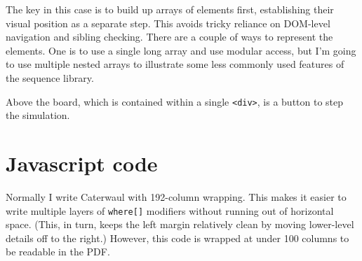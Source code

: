 \documentclass{report}
\begin{document}
    The key in this case is to build up arrays of elements first, establishing their visual position as a separate step. This avoids tricky reliance on DOM-level navigation and sibling
    checking. There are a couple of ways to represent the elements. One is to use a single long array and use modular access, but I'm going to use multiple nested arrays to illustrate some
    less commonly used features of the sequence library.

    Above the board, which is contained within a single \verb|<div>|, is a button to step the simulation.

\section{Javascript code}
    Normally I write Caterwaul with 192-column wrapping. This makes it easier to write multiple layers of {\tt where[]} modifiers without running out of horizontal space. (This, in turn, keeps
    the left margin relatively clean by moving lower-level details off to the right.) However, this code is wrapped at under 100 columns to be readable in the PDF.
\end{document}

